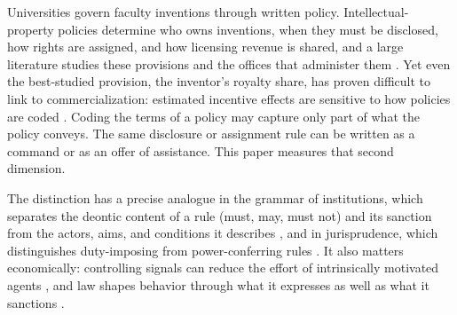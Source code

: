 Universities govern faculty inventions through written policy. Intellectual-property policies determine who owns inventions, when they must be disclosed, how rights are assigned, and how licensing revenue is shared, and a large literature studies these provisions and the offices that administer them \citep{mowery2001growth,mowery2004ivory,sampat2006patenting,thursby2002selling,jensen2003disclosure,feldman2002equity,siegel2003assessing,siegel2007technology,perkmann2013academic}. Yet even the best-studied provision, the inventor's royalty share, has proven difficult to link to commercialization: estimated incentive effects \citep{lach2008incentives} are sensitive to how policies are coded \citep{ouellette2020patent}. Coding the terms of a policy may capture only part of what the policy conveys. The same disclosure or assignment rule can be written as a command or as an offer of assistance. This paper measures that second dimension.


The distinction has a precise analogue in the grammar of institutions, which separates the deontic content of a rule (must, may, must not) and its sanction from the actors, aims, and conditions it describes \citep{crawford1995grammar}, and in jurisprudence, which distinguishes duty-imposing from power-conferring rules \citep{hart1961concept}. It also matters economically: controlling signals can reduce the effort of intrinsically motivated agents \citep{frey1997not,benabou2003intrinsic,falk2006hidden}, and law shapes behavior through what it expresses as well as what it sanctions \citep{sunstein1996expressive,mcadams2015expressive}.


